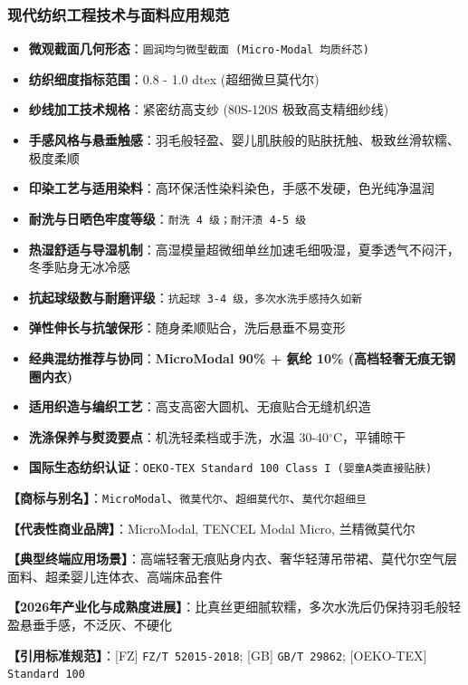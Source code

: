 \documentclass[11pt,openright,twoside,UTF8]{ctexbook}
\begin{document}
\subsubsection*{现代纺织工程技术与面料应用规范}
\begin{itemize} \setlength{\itemsep}{2pt}
    \item \textbf{微观截面几何形态}：\texttt{圆润均匀微型截面 (Micro-Modal 均质纤芯)}
    \item \textbf{纺织细度指标范围}：0.8 - 1.0 dtex (超细微旦莫代尔)
    \item \textbf{纱线加工技术规格}：紧密纺高支纱 (80S-120S 极致高支精细纱线)
    \item \textbf{手感风格与悬垂触感}：羽毛般轻盈、婴儿肌肤般的贴肤抚触、极致丝滑软糯、极度柔顺
    \item \textbf{印染工艺与适用染料}：高环保活性染料染色，手感不发硬，色光纯净温润
    \item \textbf{耐洗与日晒色牢度等级}：\texttt{耐洗 4 级；耐汗渍 4-5 级}
    \item \textbf{热湿舒适与导湿机制}：高湿模量超微细单丝加速毛细吸湿，夏季透气不闷汗，冬季贴身无冰冷感
    \item \textbf{抗起球级数与耐磨评级}：\texttt{抗起球 3-4 级，多次水洗手感持久如新}
    \item \textbf{弹性伸长与抗皱保形}：随身柔顺贴合，洗后悬垂不易变形
    \item \textbf{经典混纺推荐与协同}：\textbf{MicroModal 90\% + 氨纶 10\% (高档轻奢无痕无钢圈内衣)}
    \item \textbf{适用织造与编织工艺}：高支高密大圆机、无痕贴合无缝机织造
    \item \textbf{洗涤保养与熨烫要点}：机洗轻柔档或手洗，水温 30-40$^\circ\mathrm{C}$，平铺晾干
    \item \textbf{国际生态纺织认证}：\texttt{OEKO-TEX Standard 100 Class I (婴童A类直接贴肤)}
\end{itemize}
\vspace{0.2cm}

\noindent\textbf{【商标与别名】}：\texttt{MicroModal}、\texttt{微莫代尔}、\texttt{超细莫代尔}、\texttt{莫代尔超细旦}\par
\noindent\textbf{【代表性商业品牌】}：MicroModal, TENCEL Modal Micro, 兰精微莫代尔\par
\noindent\textbf{【典型终端应用场景】}：高端轻奢无痕贴身内衣、奢华轻薄吊带裙、莫代尔空气层面料、超柔婴儿连体衣、高端床品套件\par
\noindent\textbf{【2026年产业化与成熟度进展】}：比真丝更细腻软糯，多次水洗后仍保持羽毛般轻盈悬垂手感，不泛灰、不硬化\par
\noindent\textbf{【引用标准规范】}：[FZ] \texttt{FZ/T 52015-2018}; [GB] \texttt{GB/T 29862}; [OEKO-TEX] \texttt{Standard 100}\par
\vspace{0.5cm}
\end{document}
